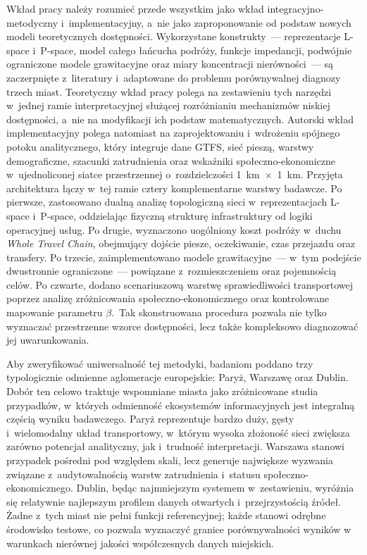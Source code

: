 \documentclass{pracamgr}
\begin{document}
Wkład pracy należy rozumieć przede wszystkim jako wkład integracyjno-metodyczny i~implementacyjny, a~nie jako zaproponowanie od podstaw nowych modeli teoretycznych dostępności. Wykorzystane konstrukty~--- reprezentacje \mbox{L-space} i~\mbox{P-space}, model całego łańcucha podróży, funkcje impedancji, podwójnie ograniczone modele grawitacyjne oraz miary koncentracji nierówności~--- są zaczerpnięte z~literatury i~adaptowane do problemu porównywalnej diagnozy trzech miast. Teoretyczny wkład pracy polega na zestawieniu tych narzędzi w~jednej ramie interpretacyjnej służącej rozróżnianiu mechanizmów niskiej dostępności, a~nie na modyfikacji ich podstaw matematycznych. Autorski wkład implementacyjny polega natomiast na zaprojektowaniu i~wdrożeniu spójnego potoku analitycznego, który integruje dane GTFS, sieć pieszą, warstwy demograficzne, szacunki zatrudnienia oraz wskaźniki społeczno-ekonomiczne w~ujednoliconej siatce przestrzennej o~rozdzielczości 1~km~$\times$~1~km. Przyjęta architektura łączy w~tej ramie cztery komplementarne warstwy badawcze. Po pierwsze, zastosowano dualną analizę topologiczną sieci w~reprezentacjach \mbox{L-space} i~\mbox{P-space}, oddzielając fizyczną strukturę infrastruktury od logiki operacyjnej usług. Po drugie, wyznaczono uogólniony koszt podróży w~duchu \textit{Whole Travel Chain}, obejmujący dojście piesze, oczekiwanie, czas przejazdu oraz transfery. Po trzecie, zaimplementowano modele grawitacyjne~--- w~tym podejście dwustronnie ograniczone~--- powiązane z~rozmieszczeniem oraz pojemnością celów. Po czwarte, dodano scenariuszową warstwę sprawiedliwości transportowej poprzez analizę zróżnicowania społeczno-ekonomicznego oraz kontrolowane mapowanie parametru $\beta$.~Tak skonstruowana procedura pozwala nie tylko wyznaczać przestrzenne wzorce dostępności, lecz także kompleksowo diagnozować jej uwarunkowania.

Aby zweryfikować uniwersalność tej metodyki, badaniom poddano trzy typologicznie odmienne aglomeracje europejskie: Paryż, Warszawę oraz Dublin. Dobór ten celowo traktuje wspomniane miasta jako zróżnicowane studia przypadków, w~których odmienność ekosystemów informacyjnych jest integralną częścią wyniku badawczego. Paryż reprezentuje bardzo duży, gęsty i~wielomodalny układ transportowy, w~którym wysoka złożoność sieci zwiększa zarówno potencjał analityczny, jak i~trudność interpretacji. Warszawa stanowi przypadek pośredni pod względem skali, lecz generuje największe wyzwania związane z~audytowalnością warstw zatrudnienia i~statusu społeczno-ekonomicznego. Dublin, będąc najmniejszym systemem w~zestawieniu, wyróżnia się relatywnie najlepszym profilem danych otwartych i~przejrzystością źródeł. Żadne z~tych miast nie pełni funkcji referencyjnej; każde stanowi odrębne środowisko testowe, co pozwala wyznaczyć granice porównywalności wyników w warunkach nierównej jakości współczesnych danych miejskich.
\end{document}
